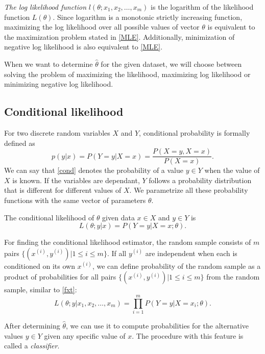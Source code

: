 \documentclass[times, utf8, zavrsni]{fer}
\begin{document}
\emph{The log likelihood function} $l(\theta; x_1, x_2, \dots, x_m)$ is the logarithm of the likelihood function $L(\theta)$. Since logarithm is a monotonic strictly increasing function, maximizing the log likelihood over all possible values of vector $\theta$ is equivalent to the maximization problem stated in \eqref{MLE}. Additionally, minimization of negative log likelihood is also equivalent to \eqref{MLE}.

When we want to determine $\hat\theta$ for the given dataset, we will choose between solving the problem of maximizing the likelihood, maximizing log likelihood or minimizing negative log likelihood.

\subsection{Conditional likelihood}

For two discrete random variables $X$ and $Y$, conditional probability is formally defined as 
\begin{equation}
\label{cond}
	p(y | x) = P(Y = y | X = x) = \frac{P(X = y, X = x)}{P(X = x)}. 
\end{equation}
We can say that \eqref{cond} denotes the probability of a value $y \in Y$ when the value of $X$ is known. If the variables are dependant, $Y$ follows a probability distribution that is different for different values of $X$. We parametrize all these probability functions with the same vector of parameters $\theta$.

The conditional likelihood of $\theta$ given data $x \in X$ and $y \in Y$ is 
\begin{equation}
	L(\theta;y | x) = P(Y = y | X = x; \theta ).
\end{equation}

For finding the conditional likelihood estimator, the random sample consists of $m$  pairs $\{(x^{(i)}, y^{(i)}) | 1 \le i \le m\}$. If  all $y^{(i)}$ are independent when each is conditioned on its own $x^{(i)}$, we can define probability of the random sample as a product of probabilities for all pairs $\{(x^{(i)}, y^{(i)}) | 1 \le i \le m\}$ from the random sample, similar to \eqref{fxt}:
\begin{equation}
\label{fxt2}
 L(\theta; y | x_1, x_2, \dots, x_m) = \prod_{i=1}^{m}{P(Y = y | X = x_i;\theta)}    . 
\end{equation}

After determining $\hat\theta$, we can use it to compute probabilities for the alternative values $y \in Y$ given any specific value of $x$. The procedure with this feature is called a \emph{classifier}.
\end{document}
